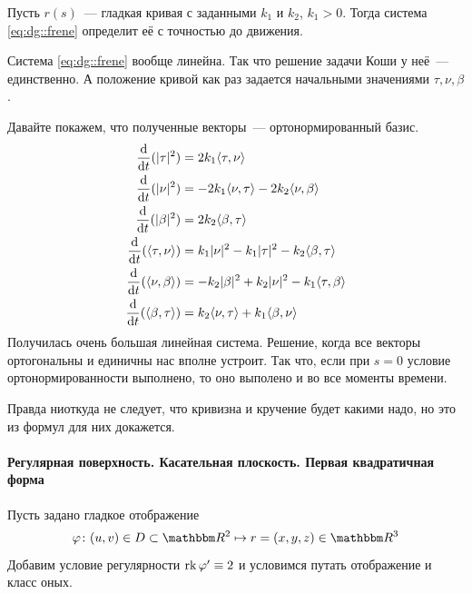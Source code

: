 \documentclass[draft,timbord]{longnotes}
\begin{document}
\begin{thrm}\label{thrm:dg::frene::reconst}
  Пусть $r(s)$~--- гладкая кривая с заданными $k_1$ и $k_2$, $k_1>0$. 
  Тогда система \eqref{eq:dg::frene} определит её с точностью до движения.
\end{thrm}

\begin{tproof}
  Система \eqref{eq:dg::frene} вообще линейна. Так что решение задачи Коши у неё~--- единственно.
  А положение кривой как раз задается начальными значениями $\tau , \nu , \beta $.

  Давайте покажем, что полученные векторы~--- ортонормированный базис.
  \begin{align*}
    \frac{\mathrm{d} }{\mathrm{d} t}(|\tau|^2)  &= 2 k_1 \langle \tau, \nu \rangle \\
    \frac{\mathrm{d} }{\mathrm{d} t} (|\nu|^2)  &= -2 k_1 \langle \nu, \tau \rangle - 2 k_2 \langle \nu , \beta \rangle\\
    \frac{\mathrm{d} }{\mathrm{d} t} (|\beta|^2)  &= 2 k_2 \langle \beta, \tau \rangle \\
    \frac{\mathrm{d} }{\mathrm{d} t} (\langle \tau, \nu \rangle)  
    &= k_1 |\nu|^2 - k_1 |\tau|^2 - k_2 \langle \beta, \tau \rangle \\
    \frac{\mathrm{d} }{\mathrm{d} t} (\langle \nu, \beta \rangle)  
    &= -k_2 |\beta|^2 + k_2 |\nu|^2 - k_1 \langle \tau,\beta \rangle \\
    \frac{\mathrm{d} }{\mathrm{d} t} (\langle \beta,\tau \rangle)  
    &= k_2 \langle \nu, \tau \rangle + k_1 \langle \beta, \nu  \rangle
  \end{align*}
  Получилась очень большая линейная система. Решение, когда все векторы ортогональны и единичны
  нас вполне устроит. Так что, если при $s=0$ условие ортонормированности выполнено, то оно
  выполено и во все моменты времени.

  Правда ниоткуда не следует, что кривизна и кручение будет какими надо, но это
  из формул для них докажется.
\end{tproof}


\paragraph{Регулярная поверхность. Касательная плоскость. Первая квадратичная форма}
\label{par:dg::tangplane}

\begin{defn}\label{defn:dg::tangplane::manifold}
  Пусть задано гладкое отображение \[
    \varphi \colon (u,v) \in D \subset \R^2 \mapsto r=(x,y,z) \in \R^3
  \]
  Добавим условие регулярности $\operatorname{rk} \varphi' \equiv 2$ и условимся путать отображение и класс 
  оных.
\end{defn}
\end{document}
